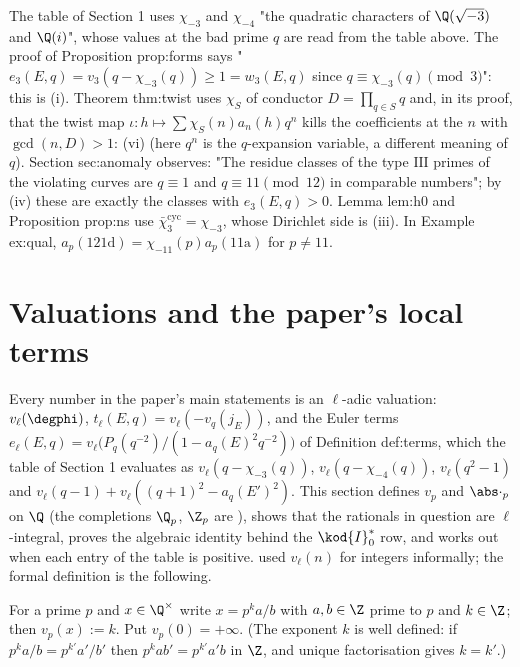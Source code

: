 \begin{paperlink}\label{pl:rings:characters}
The table of Section 1 uses $\chi_{-3}$ and $\chi_{-4}$ "the quadratic characters of $\Q(\sqrt{-3})$ and $\Q(i)$", whose values at the bad prime $q$
are read from the table above. The proof of Proposition prop:forms says "$e_3(E,q)=v_3(q-\chi_{-3}(q))\ge1=w_3(E,q)$ since $q\equiv\chi_{-3}(q)\pmod3$":
this is (i). Theorem thm:twist uses $\chi_S$ of conductor $D=\prod_{q\in S}q$ and, in its proof, that the twist map
$\iota\colon h\mapsto\sum\chi_S(n)a_n(h)q^n$ kills the coefficients at the $n$ with $\gcd(n,D)>1$: (vi) (here $q^n$ is the
$q$-expansion variable, a different meaning of $q$). Section sec:anomaly observes: "The residue classes of the type $\mathrm{III}$
primes of the violating curves are $q\equiv1$ and $q\equiv11\pmod{12}$ in comparable numbers"; by (iv) these are exactly the classes with $e_3(E,q)>0$. Lemma lem:h0 and
Proposition prop:ns use $\bar\chi_3^{\mathrm{cyc}}=\chi_{-3}$, whose Dirichlet side is (iii). In Example ex:qual, $a_p(\text{121d})=\chi_{-11}(p)a_p(\text{11a})$ for
$p\ne11$.
\end{paperlink}

\section{Valuations and the paper's local terms}\label{sec:rings:valuations}

Every number in the paper's main statements is an $\ell$-adic valuation: $v_\ell(\degphi)$, $t_\ell(E,q)=v_\ell(-v_q(j_E))$, and the Euler terms
$e_\ell(E,q)=v_\ell\bigl(P_q(q^{-2})/(1-a_q(E)^2q^{-2})\bigr)$ of Definition def:terms, which the table of Section 1 evaluates as $v_\ell(q-\chi_{-3}(q))$,
$v_\ell(q-\chi_{-4}(q))$, $v_\ell(q^2-1)$ and $v_\ell(q-1)+v_\ell((q+1)^2-a_q(E')^2)$. This section defines $v_p$ and $\abs\cdot_p$ on $\Q$ (the completions $\Q_p$, $\Z_p$
are ), shows that the rationals in question are $\ell$-integral, proves the algebraic identity behind the $\kod{I}_0^*$ row,
and works out when each entry of the table is positive.  used $v_\ell(n)$ for integers informally; the formal
definition is the following.

\begin{definition}\label{def:rings:valuation}
For a prime $p$ and $x\in\Q^\times$ write $x=p^ka/b$ with $a,b\in\Z$ prime to $p$ and $k\in\Z$; then $v_p(x):=k$. Put $v_p(0)=+\infty$. (The exponent $k$ is well
defined: if $p^ka/b=p^{k'}a'/b'$ then $p^kab'=p^{k'}a'b$ in $\Z$, and unique factorisation gives $k=k'$.)
\end{definition}

